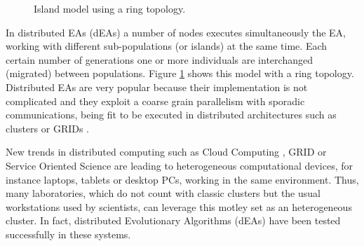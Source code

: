\documentclass[final,1p,times]{elsarticle}
\begin{document}
\begin{figure}[htb]
\centering
{}
\caption{Island model using a ring topology.}
\label{fig:islands}
\end{figure}


In distributed EAs (dEAs) a number of nodes executes simultaneously the EA, working with different sub-populations (or islands) at the same time. Each certain number of generations one or more individuals are interchanged (migrated) between populations. Figure \ref{fig:islands} shows this model with a ring topology. Distributed EAs are very popular because their implementation is
not complicated  %
 and they exploit a coarse grain parallelism with sporadic %
 communications, being fit to be executed in distributed architectures
 such as clusters or GRIDs \cite{PLATO}. %





New trends in distributed computing such as Cloud Computing \cite{CLOUD}, GRID
\cite{OPENSCIENCEGRID} or Service Oriented Science \cite{GLOBUS} are
leading to heterogeneous computational devices, for instance laptops,
tablets or desktop PCs, working in the same
environment. Thus, many laboratories, which do not count with classic
clusters but the usual workstations used by scientists, can leverage
this motley set as an heterogeneous cluster. In fact, distributed Evolutionary
Algorithms (dEAs) \cite{MULTIKULTI,PARALLELGRIDHETEROGENEOUS} have been tested successfully in these
systems.  %
\end{document}
